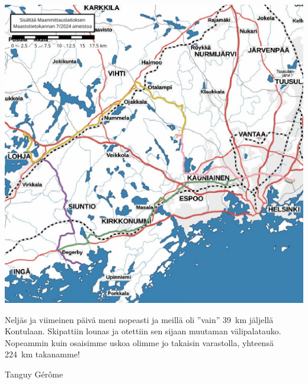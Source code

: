 \begin{multicols}{2}
\begin{center}
	\end{center}
	\columnbreak
	\vspace*{0.32cm}
	\begin{center}
		\noindent\includegraphics[width=1.05\linewidth]{assets/pyörävaellus27}
	\end{center}
	\vspace*{2cm}
	\begin{addmargin}[0.32cm]{0cm}
		{\small
		Neljäs ja viimeinen päivä meni nopeasti ja meillä oli ''vain'' 39~km
		jäljellä Kontulaan.
		Skipattiin lounas ja otettiin sen sijaan muutaman
		välipalatauko. Nopeammin kuin osaisimme uskoa olimme jo takaisin
		varastolla, yhteensä 224~km takanamme!
		}
	\end{addmargin}
\end{multicols}
\vspace*{-0.32cm}


\medskip
\noindent\null\hfill Tanguy Gérôme

